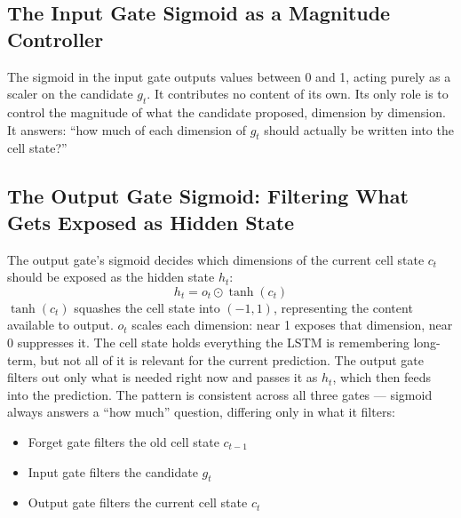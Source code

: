 \documentclass[12pt,a4paper]{article}
\begin{document}
\subsection{The Input Gate Sigmoid as a Magnitude Controller}
The sigmoid in the input gate outputs values between 0 and 1, acting purely as a scaler on the candidate $g_t$. It contributes no content of its own. Its only role is to control the magnitude of what the candidate proposed, dimension by dimension. It answers: ``how much of each dimension of $g_t$ should actually be written into the cell state?''

\subsection{The Output Gate Sigmoid: Filtering What Gets Exposed as Hidden State}
The output gate's sigmoid decides which dimensions of the current cell state $c_t$ should be exposed as the hidden state $h_t$:
\[
h_t = o_t \odot \tanh(c_t)
\]
$\tanh(c_t)$ squashes the cell state into $(-1, 1)$, representing the content available to output. $o_t$ scales each dimension: near 1 exposes that dimension, near 0 suppresses it. The cell state holds everything the LSTM is remembering long-term, but not all of it is relevant for the current prediction. The output gate filters out only what is needed right now and passes it as $h_t$, which then feeds into the prediction. The pattern is consistent across all three gates --- sigmoid always answers a ``how much'' question, differing only in what it filters:
\begin{itemize}
    \item Forget gate filters the old cell state $c_{t-1}$
    \item Input gate filters the candidate $g_t$
    \item Output gate filters the current cell state $c_t$
\end{itemize}



\end{document}
